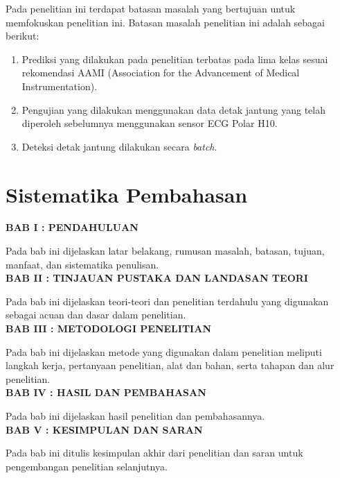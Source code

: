 Pada penelitian ini terdapat batasan masalah yang bertujuan untuk memfokuskan penelitian ini. Batasan masalah penelitian ini adalah sebagai berikut:
\begin{enumerate}
  \item Prediksi yang dilakukan pada penelitian terbatas pada lima kelas sesuai rekomendasi AAMI (Association for the Advancement of Medical Instrumentation).
  \item Pengujian yang dilakukan menggunakan data detak jantung yang telah diperoleh sebelumnya menggunakan sensor ECG Polar H10.
  \item Deteksi detak jantung dilakukan secara \textit{batch}.
\end{enumerate}




\section{Sistematika Pembahasan}
\noindent
\textbf{BAB I : PENDAHULUAN}

Pada bab ini dijelaskan latar belakang, rumusan masalah, batasan,
tujuan, manfaat,  dan sistematika penulisan.\\

\noindent
\textbf{BAB II : TINJAUAN PUSTAKA DAN LANDASAN TEORI}

Pada bab ini dijelaskan teori-teori dan penelitian terdahulu yang
digunakan sebagai acuan dan dasar dalam penelitian.\\

\noindent
\textbf{BAB III : METODOLOGI PENELITIAN}

Pada bab ini dijelaskan metode yang digunakan dalam penelitian
meliputi langkah kerja, pertanyaan penelitian, alat dan bahan, serta
tahapan dan alur penelitian.\\

\noindent
\textbf{BAB IV : HASIL DAN PEMBAHASAN}

Pada bab ini dijelaskan hasil penelitian dan pembahasannya.\\

\noindent
\textbf{BAB V : KESIMPULAN DAN SARAN}

Pada bab ini ditulis kesimpulan akhir dari penelitian dan saran untuk
pengembangan penelitian selanjutnya.\\
